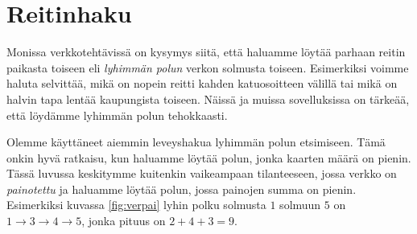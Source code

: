 \chapter{Reitinhaku}

Monissa verkkotehtävissä on kysymys siitä,
että haluamme löytää parhaan reitin paikasta toiseen
eli \emph{lyhimmän polun} verkon solmusta toiseen.
Esimerkiksi voimme haluta selvittää,
mikä on nopein reitti kahden katuosoitteen välillä
tai mikä on halvin tapa lentää kaupungista toiseen.
Näissä ja muissa sovelluksissa on tärkeää,
että löydämme lyhimmän polun tehokkaasti.

Olemme käyttäneet aiemmin leveyshakua lyhimmän
polun etsimiseen.
Tämä onkin hyvä ratkaisu, kun haluamme löytää polun,
jonka kaarten määrä on pienin.
Tässä luvussa keskitymme kuitenkin vaikeampaan
tilanteeseen, jossa verkko on \emph{painotettu}
ja haluamme löytää polun,
jossa painojen summa on pienin.
Esimerkiksi kuvassa \ref{fig:verpai}
lyhin polku solmusta $1$ solmuun $5$ on
$1 \rightarrow 3 \rightarrow 4 \rightarrow 5$,
jonka pituus on $2+4+3=9$.

